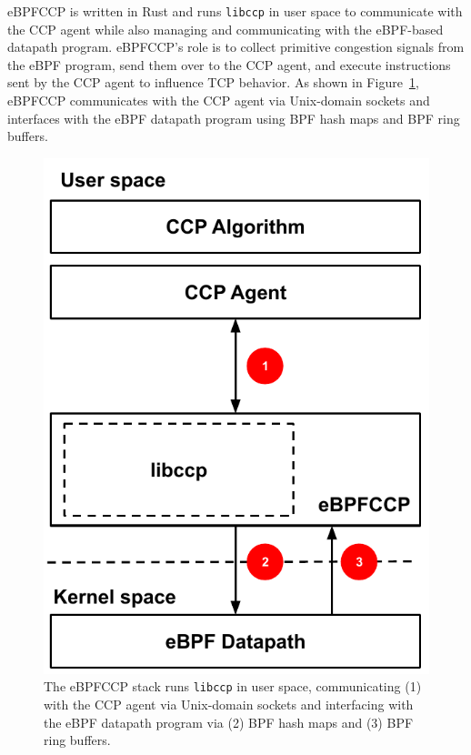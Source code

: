 \documentclass[../main.tex]{subfiles}
\begin{document}
eBPFCCP is written in Rust and runs \texttt{libccp} in user space to communicate with the CCP agent while also managing and communicating with the eBPF-based datapath program.
eBPFCCP's role is to collect primitive congestion signals from the eBPF program, send them over to the CCP agent, and execute instructions sent by the CCP agent to influence TCP behavior.
As shown in Figure~\ref{fig:ebpfccp}, eBPFCCP communicates with the CCP agent via Unix-domain sockets and interfaces with the eBPF datapath program using BPF hash maps and BPF ring buffers.

\begin{figure}[t]
\centering
    \includegraphics[width=\columnwidth]{img/ebpfccp}
    \caption{The eBPFCCP stack runs \texttt{libccp} in user space, communicating (1) with the CCP agent via Unix-domain sockets and interfacing with the eBPF datapath program via (2) BPF hash maps and (3) BPF ring buffers.
    }\label{fig:ebpfccp}
\end{figure}
\end{document}
